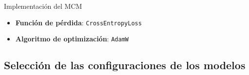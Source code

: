\begin{frame}{Implementación del MCM}
	\begin{itemize}
		\item \textbf{Función de pérdida}: \texttt{CrossEntropyLoss}
		\item \textbf{Algoritmo de optimización}: \texttt{AdamW}
	\end{itemize}
	
	
	\begin{table}[H]
		\centering 
		\caption{Valores de los hiperparámetros utilizados en los experimentos del modelo de clasificación multiclase.}
		\label{tab:hiperBIN}
	\end{table}
\end{frame}



\subsection{Selección de las configuraciones de los modelos}

